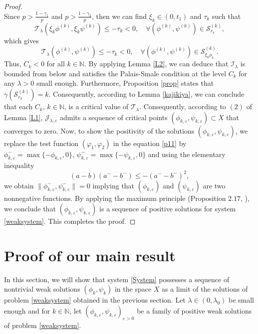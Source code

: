 \documentclass[reqno]{amsart}
\begin{document}
\begin{proof}
$$$$
Since $p>\frac{1-\gamma_1}{p}$ and $p>\frac{1-\gamma_2}{p}$, then we can find 
$\xi_k\in (0,t_1)$ and $\tau_k$ such that
\[
\mathcal{T}_{\lambda}(\xi_k\phi^{(k)},\xi_k\psi^{(k)})\leq -\tau_k<0,\quad 
\forall (\phi^{(k)},\psi^{(k)})\in \mathscr{S}_{r_k}^{(k)}, 
\]
which gives
\[
\mathcal{T}_{\lambda}(\phi^{(k)},\psi^{(k)})\leq -\tau_k<0,\quad 
\forall (\phi^{(k)},\psi^{(k)})\in \mathscr{S}_{\xi_k\rho_k}^{(k)}.
\]
Thus, $C_k<0$ for all $k\in\mathbb{N}$. By applying Lemma \ref{L2}, we can deduce that 
$\mathcal{I}_\lambda$ is bounded from below and satisfies the Palais-Smale condition 
at the level $C_k$ for any $\lambda>0$ small enough. Furthermore, 
Proposition \ref{prop} states that $\gamma(\mathscr{S}_{r_k}^{(k)})=k$. 
Consequently, according to Lemma \ref{kajikiya}, we can conclude that each $C_k$, 
$k\in \mathbb{N}$, is a critical value of $\mathcal{T}_{\lambda}$. 
Consequently, according to $(2)$ of Lemma \ref{L1}, $\mathcal{J}_{\lambda,\varepsilon}$ 
admits a sequence of critical points 
$(\phi_{k,\varepsilon},\psi_{k,\varepsilon})\subset X$ that converges to zero. 
Now, to show the positivity of the solutions 
$(\phi_{k,\varepsilon},\psi_{k,\varepsilon})$, we replace the test function 
$(\varphi_1,\varphi_2)$ in the equation \eqref{p11} by 
$\phi_{k,\varepsilon}^-=\max\lbrace -\phi_{k,\varepsilon},0\rbrace$, 
$\psi_{k,\varepsilon}^-=\max\lbrace -\psi_{k,\varepsilon},0\rbrace$  and using the 
elementary inequality
$$
(a-b)(a^--b^-)\leq -(a^--b^-)^2, 
$$
we obtain $\| \phi_{k,\varepsilon}^-,\psi_{k,\varepsilon}^-\|=0$ implying that 
$(\phi_{k,\varepsilon})$ and $(\psi_{k,\varepsilon})$ are two nonnegative functions. 
By applying the maximum principle (Proposition $2.17$, \cite{max}), we conclude that 
$(\phi_{k,\varepsilon},\psi_{k,\varepsilon})$ is a sequence of positive solutions for 
system \eqref{weaksystem}. This completes the proof.
\end{proof}

\section{Proof of our main result}

In this section, we will show that system \eqref{System} possesses a sequence of 
nontrivial weak solutions $(\phi_k,\psi_k)$ in the space $X$ as a limit of the 
solutions of problem \eqref{weaksystem} obtained in the previous section. 
Let $\lambda\in (0,\lambda_0)$ be small enough and for $k\in\mathbb{N}$, 
let $(\phi_{k,\varepsilon},\psi_{k,\varepsilon})_{\varepsilon>0}$ be a family of
 positive weak solutions of problem \eqref{weaksystem}.
\smallskip
\end{document}
